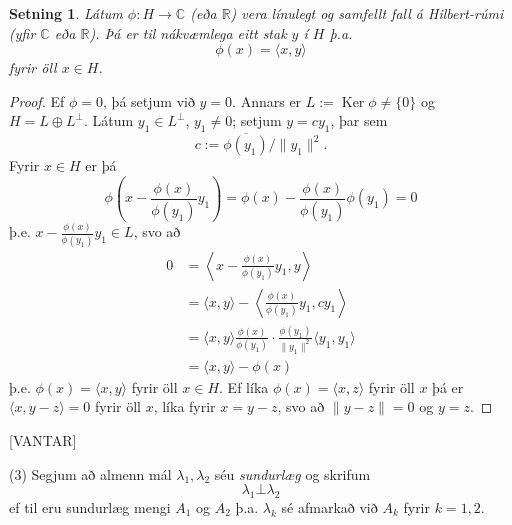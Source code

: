 \documentclass[a4paper,icelandic,11pt]{book}
\theoremstyle{plain}      \newtheorem{setn}{Setning}[chapter]
\theoremstyle{definition} \newtheorem{skilgr}[setn]{Skilgreining}
\theoremstyle{remark}     \newtheorem*{ath}{Athugasemd}
\newcommand{\R}{\mathbb R}
\newcommand{\C}{\mathbb C}
\DeclareMathOperator{\Ker}{Ker}
\begin{document}
\begin{setn}
  Látum $\phi:H\to\C$ (eða $\R$) vera línulegt og samfellt fall á
  Hilbert-rúmi (yfir $\C$ eða $\R$). Þá er til nákvæmlega eitt stak
  $y$ í $H$ þ.a.
  \[
  \phi(x) = \langle x, y\rangle
  \]
  fyrir öll $x\in H$.
\end{setn}
\begin{proof}
  Ef $\phi = 0$, þá setjum við $y = 0$. Annars er $L :=
  \Ker\phi\ne\{0\}$ og $H = L\oplus L^{\bot}$. Látum $y_{1}\in
  L^{\bot}$, $y_{1}\ne 0$; setjum $y = cy_{1}$, þar sem 
  \[
  c := \overline{\phi(y_{1})} / \| y_{1}\|^{2}.
  \]
  Fyrir $x\in H$ er þá 
  \[
  \phi\left(
    x - \frac{\phi(x)}{\phi(y_{1})} y_{1}
  \right)
  = \phi(x) - \frac{\phi(x)}{\phi(y_{1})}\phi(y_{1})
  = 0
  \]
  þ.e. $x - \frac{\phi(x)}{\phi(y_{1})}y_{1}\in L$, svo að
  \begin{align*}
    0
    &= \left\langle x - \frac{\phi(x)}{\phi(y_{1})}
      y_{1},y\right\rangle
    \\
    &= \langle x,y\rangle
    - \left\langle\frac{\phi(x)}{\phi(y_{1})}y_{1},c
      y_{1}\right\rangle
    \\
    &= \langle x,y \rangle
    \frac{\phi(x)}{\phi(y_{1})}\cdot \frac{\phi(y_{1})}{\|y_{1}\|^{2}}
    \langle y_{1},y_{1}\rangle
    \\
    &= \langle x,y\rangle - \phi(x)
  \end{align*}
  þ.e. $\phi(x) = \langle x,y\rangle$ fyrir öll $x\in H$. Ef líka
  $\phi(x) = \langle x,z\rangle$ fyrir öll $x$ þá er $\langle
  x,y-z\rangle = 0$ fyrir öll $x$, líka fyrir $x = y-z$, svo að
  $\|y-z\|=0$ og $y=z$.
\end{proof}
[VANTAR]

(3) Segjum að almenn mál $\lambda_{1},\lambda_{2}$ séu
\emph{sundurlæg} og skrifum 
\[
\lambda_{1}\bot \lambda_{2}
\]
ef til eru sundurlæg mengi $A_{1}$ og $A_{2}$ þ.a. $\lambda_{k}$ sé
afmarkað við $A_{k}$ fyrir $k=1,2$.
\end{document}
